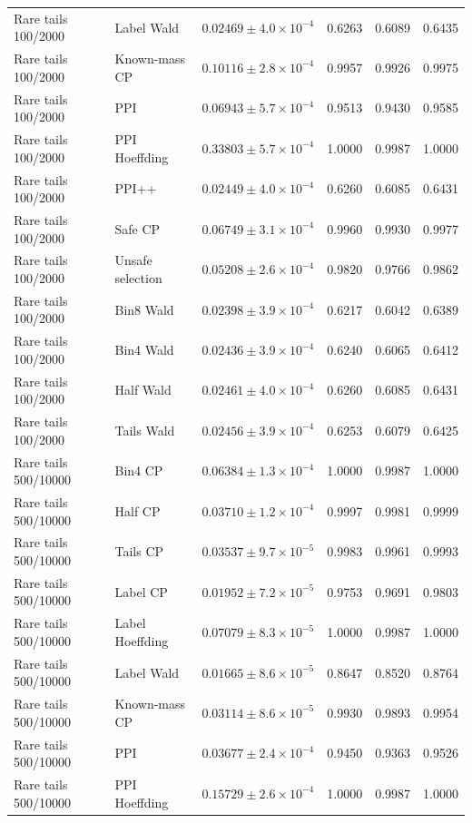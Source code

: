 \begin{longtable}{llrrrr}
Rare tails 100/2000 & Label Wald & $0.02469\pm 4.0\times 10^{-4}$ & 0.6263 & 0.6089 & 0.6435 \\
Rare tails 100/2000 & Known-mass CP & $0.10116\pm 2.8\times 10^{-4}$ & 0.9957 & 0.9926 & 0.9975 \\
Rare tails 100/2000 & PPI & $0.06943\pm 5.7\times 10^{-4}$ & 0.9513 & 0.9430 & 0.9585 \\
Rare tails 100/2000 & PPI Hoeffding & $0.33803\pm 5.7\times 10^{-4}$ & 1.0000 & 0.9987 & 1.0000 \\
Rare tails 100/2000 & PPI++ & $0.02449\pm 4.0\times 10^{-4}$ & 0.6260 & 0.6085 & 0.6431 \\
Rare tails 100/2000 & Safe CP & $0.06749\pm 3.1\times 10^{-4}$ & 0.9960 & 0.9930 & 0.9977 \\
Rare tails 100/2000 & Unsafe selection & $0.05208\pm 2.6\times 10^{-4}$ & 0.9820 & 0.9766 & 0.9862 \\
Rare tails 100/2000 & Bin8 Wald & $0.02398\pm 3.9\times 10^{-4}$ & 0.6217 & 0.6042 & 0.6389 \\
Rare tails 100/2000 & Bin4 Wald & $0.02436\pm 3.9\times 10^{-4}$ & 0.6240 & 0.6065 & 0.6412 \\
Rare tails 100/2000 & Half Wald & $0.02461\pm 4.0\times 10^{-4}$ & 0.6260 & 0.6085 & 0.6431 \\
Rare tails 100/2000 & Tails Wald & $0.02456\pm 3.9\times 10^{-4}$ & 0.6253 & 0.6079 & 0.6425 \\
Rare tails 500/10000 & Bin4 CP & $0.06384\pm 1.3\times 10^{-4}$ & 1.0000 & 0.9987 & 1.0000 \\
Rare tails 500/10000 & Half CP & $0.03710\pm 1.2\times 10^{-4}$ & 0.9997 & 0.9981 & 0.9999 \\
Rare tails 500/10000 & Tails CP & $0.03537\pm 9.7\times 10^{-5}$ & 0.9983 & 0.9961 & 0.9993 \\
Rare tails 500/10000 & Label CP & $0.01952\pm 7.2\times 10^{-5}$ & 0.9753 & 0.9691 & 0.9803 \\
Rare tails 500/10000 & Label Hoeffding & $0.07079\pm 8.3\times 10^{-5}$ & 1.0000 & 0.9987 & 1.0000 \\
Rare tails 500/10000 & Label Wald & $0.01665\pm 8.6\times 10^{-5}$ & 0.8647 & 0.8520 & 0.8764 \\
Rare tails 500/10000 & Known-mass CP & $0.03114\pm 8.6\times 10^{-5}$ & 0.9930 & 0.9893 & 0.9954 \\
Rare tails 500/10000 & PPI & $0.03677\pm 2.4\times 10^{-4}$ & 0.9450 & 0.9363 & 0.9526 \\
Rare tails 500/10000 & PPI Hoeffding & $0.15729\pm 2.6\times 10^{-4}$ & 1.0000 & 0.9987 & 1.0000 \\

\end{longtable}
